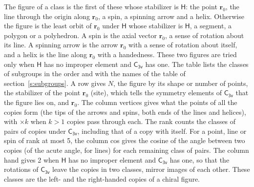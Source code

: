 \documentclass[10pt,a4paper]{article}
\numberwithin{equation}{section}
\newcommand{\grp}[1]{\mathsf{#1}}
\newcommand{\pointr}{\mathbf{r}}
\begin{document}
\leavevmode\label{n:head.figure}The figure of a class is the first of these whose stabilizer is $\grp{H}$: the point $\pointr_0$, the line through the origin along $\pointr_0$, a spin, a spinning arrow and a helix. Otherwise the figure is the least orbit of $\pointr_0$ under $\grp{H}$ whose stabilizer is $\grp{H}$, a segment, a polygon or a polyhedron. A spin is the axial vector $\pointr_0$, a sense of rotation about its line. A spinning arrow is the arrow $\pointr_0$ with a sense of rotation about itself, and a helix is the line along $\pointr_0$ with a handedness. These two figures are tried only when $\grp{H}$ has no improper element and $\grp{C_{3v}}$ has one. The table lists the classes of subgroups in the order and with the names of the table of section~\ref{s:subgroups}. \label{n:head.site}A row gives $N$, the figure by its shape or number of points, the stabilizer of the point $\pointr_0$ (site), which tells the symmetry elements of $\grp{C_{3v}}$ that the figure lies on, and $\pointr_0$. \label{n:head.vertices}The column vertices gives what the points of all the copies form (the tips of the arrows and spins, both ends of the lines and helices), with ${\times}k$ when $k > 1$ copies pass through each. \label{n:head.rank}The rank counts the classes of pairs of copies under $\grp{C_{3v}}$, including that of a copy with itself. \label{n:head.cos}For a point, line or spin of rank at most 5, the column cos gives the cosine of the angle between two copies (of the acute angle, for lines) for each remaining class of pairs. \label{n:head.hand}The column hand gives 2 when $\grp{H}$ has no improper element and $\grp{C_{3v}}$ has one, so that the rotations of $\grp{C_{3v}}$ leave the copies in two classes, mirror images of each other. These classes are the left- and the right-handed copies of a chiral figure.
\end{document}
